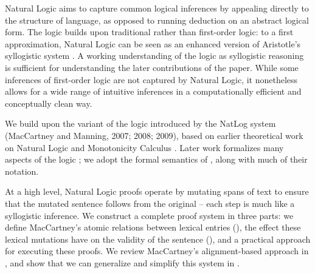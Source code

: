 Natural Logic aims to capture common logical
  inferences by appealing directly to the structure of language,
  as opposed to running deduction on an abstract logical form.
The logic builds upon traditional rather than first-order logic:
  to a first approximation, Natural Logic can be seen as
  an enhanced version of Aristotle's syllogistic system
  \cite{key:2008vanbenthem-natlog}.
A working understanding of the logic as syllogistic reasoning
  is sufficient for understanding the later contributions of the paper.
While some inferences of first-order logic are not captured by 
  Natural Logic,
  it nonetheless allows for a wide range of intuitive inferences in
  a computationally efficient and conceptually clean way.

We build upon the variant of the logic introduced by
  the NatLog system (MacCartney and Manning, 2007; 2008; 2009),
  \nocite{key:2007maccartney-natlog}
  \nocite{key:2008maccartney-natlog}
  \nocite{key:2009maccartney-natlog}
  based on earlier theoretical work on Natural Logic and 
  Monotonicity Calculus
  \cite{key:1986benthem-natlog,key:1991valencia-natlog}.
Later work formalizes many aspects of the logic
  \cite{key:2012icard-natlog,key:2013djalali-natlog};
  we adopt the formal semantics of
  , along with much of their
  notation.

At a high level, Natural Logic proofs operate by mutating spans of text
  to ensure that the mutated sentence follows from the
  original -- each step is much like a syllogistic inference.
We construct a complete proof system in three parts:
  we define MacCartney's atomic relations between lexical entries
  (), the effect these lexical mutations have
  on the validity of the sentence (),
  and a practical approach for executing these proofs.
We review MacCartney's alignment-based approach in
  , and show that we can generalize and
  simplify this system in .

